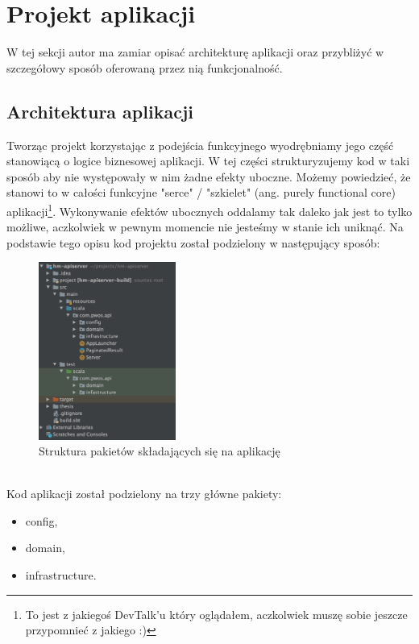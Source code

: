 \documentclass[../main.tex]{subfiles}
\begin{document}
\section{Projekt aplikacji}
W tej sekcji autor ma zamiar opisać architekturę aplikacji oraz przybliżyć w szczegółowy sposób oferowaną przez nią funkcjonalność.

\subsection{Architektura aplikacji}
Tworząc projekt korzystając z podejścia funkcyjnego wyodrębniamy jego część stanowiącą o logice biznesowej aplikacji. W tej części strukturyzujemy kod w taki sposób aby nie występowały w nim żadne efekty uboczne. Możemy powiedzieć, że stanowi to w całości funkcyjne "serce" / "szkielet" (ang. purely functional core) aplikacji\footnote{To jest z jakiegoś DevTalk'u który oglądałem, aczkolwiek muszę sobie jeszcze przypomnieć z jakiego :) }. Wykonywanie efektów ubocznych oddalamy tak daleko jak jest to tylko możliwe, aczkolwiek w pewnym momencie nie jesteśmy w stanie ich uniknąć. Na podstawie tego opisu kod projektu został podzielony w następujący sposób:\\
\begin{figure}[h]
    \centering
    \includegraphics[width=0.4\textwidth]{images/01_project_structure.png}
    \caption{Struktura pakietów składających się na aplikację}
    \label{fig:struktura_pakietow}
\end{figure}\\
Kod aplikacji został podzielony na trzy główne pakiety:
\begin{itemize}
    \item config,
    \item domain,
    \item infrastructure.
\end{itemize}
\vspace{5ex}
\end{document}
